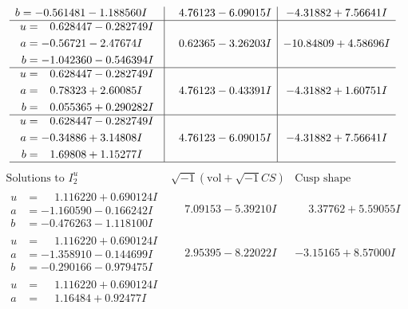 \documentclass[1p]{elsarticle_modified}
\theoremstyle{definition}
\newcommand{\I}{\sqrt{-1}}
\begin{document}
$$\begin{array}{c|c|c}
\begin{aligned}
b &= -0.561481 - 1.188560 I\end{aligned}
 & \phantom{-}4.76123 - 6.09015 I & -4.31882 + 7.56641 I \\ \hline\begin{aligned}
u &= \phantom{-}0.628447 - 0.282749 I \\
a &= -0.56721 - 2.47674 I \\
b &= -1.042360 - 0.546394 I\end{aligned}
 & \phantom{-}0.62365 - 3.26203 I & -10.84809 + 4.58696 I \\ \hline\begin{aligned}
u &= \phantom{-}0.628447 - 0.282749 I \\
a &= \phantom{-}0.78323 + 2.60085 I \\
b &= \phantom{-}0.055365 + 0.290282 I\end{aligned}
 & \phantom{-}4.76123 - 0.43391 I & -4.31882 + 1.60751 I \\ \hline\begin{aligned}
u &= \phantom{-}0.628447 - 0.282749 I \\
a &= -0.34886 + 3.14808 I \\
b &= \phantom{-}1.69808 + 1.15277 I\end{aligned}
 & \phantom{-}4.76123 - 6.09015 I & -4.31882 + 7.56641 I\\
 \hline 
 \end{array}$$\newpage$$\begin{array}{c|c|c}  
\text{Solutions to }I^u_{2}& \I (\text{vol} + \sqrt{-1}CS) & \text{Cusp shape}\\
 \hline 
\begin{aligned}
u &= \phantom{-}1.116220 + 0.690124 I \\
a &= -1.160590 - 0.166242 I \\
b &= -0.476263 - 1.118100 I\end{aligned}
 & \phantom{-}7.09153 - 5.39210 I & \phantom{-}3.37762 + 5.59055 I \\ \hline\begin{aligned}
u &= \phantom{-}1.116220 + 0.690124 I \\
a &= -1.358910 - 0.144699 I \\
b &= -0.290166 - 0.979475 I\end{aligned}
 & \phantom{-}2.95395 - 8.22022 I & -3.15165 + 8.57000 I \\ \hline\begin{aligned}
u &= \phantom{-}1.116220 + 0.690124 I \\
a &= \phantom{-}1.16484 + 0.92477 I \\

\end{aligned}
\end{array}$$
\end{document}
